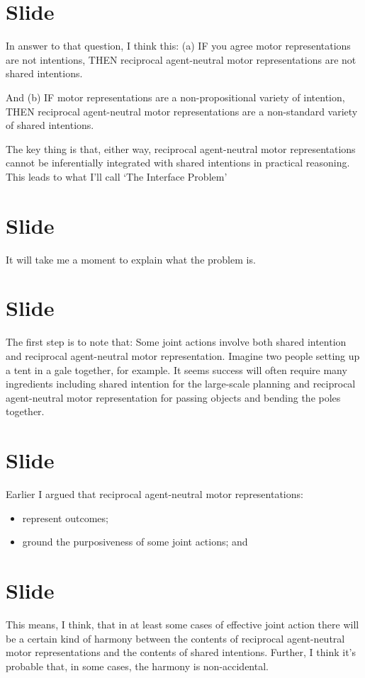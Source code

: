 \documentclass[12pt,\papersize]{extarticle}
\begin{document}
\section{Slide}
In answer to that question, I think this:
(a)
IF you agree motor representations are not intentions,
THEN reciprocal agent-neutral motor representations are not shared intentions.

And
(b)
IF motor representations are a non-propositional variety of intention,
THEN reciprocal agent-neutral motor representations are a non-standard variety of shared intentions.

The key thing is that, either way, reciprocal agent-neutral motor representations cannot be inferentially integrated with shared intentions in practical reasoning.
This leads to what I’ll call ‘The Interface Problem’


\section{Slide}
It will take me a moment to explain what the problem is.


\section{Slide}
The first step is to note that:
Some joint actions involve both shared  intention and reciprocal agent-neutral motor representation.
Imagine two people setting up a tent in a gale together, for example.
It seems success will often require many ingredients including shared intention for the large-scale planning and reciprocal agent-neutral motor representation for passing objects and bending the poles together.



\section{Slide}
Earlier I argued that reciprocal agent-neutral motor representations:

\begin{itemize}
\item represent outcomes;

\item ground the purposiveness of some 
joint actions; and
\end{itemize}


\section{Slide}
This means, I think, that in at least some cases of effective joint action there will be a certain kind of harmony between the contents of 
 reciprocal agent-neutral motor representations
 and the contents of 
 shared intentions.
Further, I think it's probable that, in some cases, the harmony is non-accidental.
 
\end{document}
